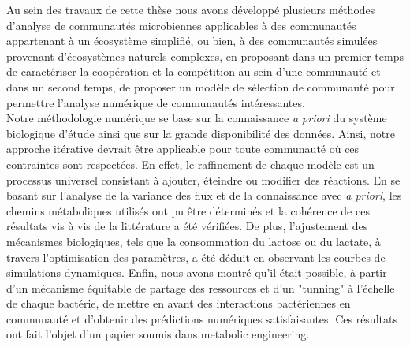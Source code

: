 \documentclass[../main.tex]{subfiles}
\begin{document}
Au sein des travaux de cette thèse nous avons développé plusieurs méthodes d'analyse de communautés microbiennes applicables à des communautés appartenant à un écosystème simplifié, ou bien, à des communautés simulées provenant d'écosystèmes naturels complexes, en proposant dans un premier temps de caractériser la coopération et la compétition au sein d'une communauté et dans un second temps, de proposer un modèle de sélection de communauté pour permettre l'analyse numérique de communautés intéressantes.\\
Notre méthodologie numérique se base sur la connaissance \textit{a priori} du système biologique d'étude ainsi que sur la grande disponibilité des données. Ainsi, notre approche itérative devrait être applicable pour toute communauté où ces contraintes sont respectées. En effet, le raffinement de chaque modèle est un processus universel consistant à ajouter, éteindre ou modifier des réactions. En se basant sur l'analyse de la variance des flux et de la connaissance avec \textit{a priori}, les chemins métaboliques utilisés ont pu être déterminés et la cohérence de ces résultats vis à vis de la littérature a été vérifiées. De plus, l'ajustement des mécanismes biologiques, tels que la consommation du lactose ou du lactate, à travers l'optimisation des paramètres, a été déduit en observant les courbes de simulations dynamiques. Enfin, nous avons montré qu'il était possible, à partir d'un mécanisme équitable de partage des ressources et d'un "tunning" à l'échelle de chaque bactérie, de mettre en avant des interactions bactériennes en communauté et d'obtenir des prédictions numériques satisfaisantes. Ces résultats ont fait l'objet d'un papier soumis dans metabolic engineering.\\
\end{document}
